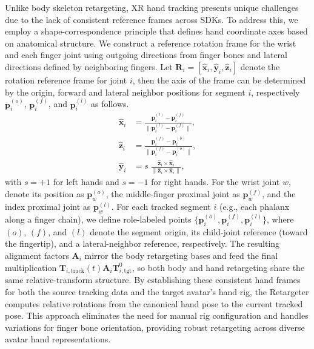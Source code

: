 Unlike body skeleton retargeting, XR hand tracking presents unique challenges due to the lack of consistent reference frames across SDKs.
To address this, we employ a shape-correspondence principle that defines hand coordinate axes based on anatomical structure.
We construct a reference rotation frame for the wrist and each finger joint using outgoing directions from finger bones and lateral directions defined by neighboring fingers.
Let $\mathbf{R}_i = [\hat{\mathbf{x}}_i,\hat{\mathbf{y}}_i,\hat{\mathbf{z}}_i]$ denote the rotation reference frame for joint $i$,
then the axis of the frame can be determined by the origin, forward and lateral neighbor positions for segment $i$, respectively $\mathbf{p}_{i}^{(o)}$, $\mathbf{p}_{i}^{(f)}$, and $\mathbf{p}_{i}^{(l)}$ as follows.
\begin{align}
    \hat{\mathbf{x}}_i &= \frac{\mathbf{p}_{i}^{(l)}-\mathbf{p}_{i}^{(f)}}{\lVert \mathbf{p}_{i}^{(l)}-\mathbf{p}_{i}^{(f)}\rVert}, \\    
    \hat{\mathbf{z}}_i &= \frac{\mathbf{p}_{i}^{(f)}-\mathbf{p}_{i}^{(o)}}{\lVert \mathbf{p}_{i}^{(f)}-\mathbf{p}_{i}^{(o)}\rVert}, \\
    \hat{\mathbf{y}}_i &= s\;\frac{\hat{\mathbf{z}}_i \times \hat{\mathbf{x}}_i}{\lVert \hat{\mathbf{z}}_i \times \hat{\mathbf{x}}_i\rVert},
\end{align}
with $s=+1$ for left hands and $s=-1$ for right hands.
For the wrist joint $w$, denote its position as $\mathbf{p}_{w}^{(o)}$, the middle-finger proximal joint as
$\mathbf{p}_{w}^{(f)}$, and the index proximal joint as $\mathbf{p}_{w}^{(l)}$.
For each tracked segment $i$ (e.g., each phalanx along a finger chain), we define role-labeled points $\{\mathbf{p}_{i}^{(o)},\mathbf{p}_{i}^{(f)},\mathbf{p}_{i}^{(l)}\}$, where $(o)$, $(f)$, and $(l)$ denote the segment origin, its child-joint reference (toward the fingertip), and a lateral-neighbor reference, respectively.
The resulting alignment factors $\mathbf{A}_{i}$ mirror the body retargeting bases and feed the final multiplication $\mathbf{T}_{i,\mathrm{track}}(t)\mathbf{A}_{i}\mathbf{T}_{i,\mathrm{tgt}}^0$, so both body and hand retargeting share the same relative-transform structure.
By establishing these consistent hand frames for both the source tracking data and the target avatar's hand rig, the Retargeter computes relative rotations from the canonical hand pose to the current tracked pose.
This approach eliminates the need for manual rig configuration and handles variations for finger bone orientation, providing robust retargeting across diverse avatar hand representations.

